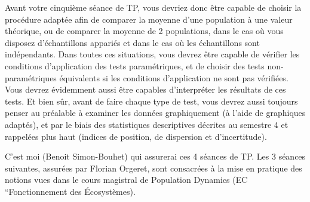 \documentclass[
  french,
  a4paper,
  DIV=11,
  numbers=noendperiod,
  oneside]{scrreprt}
\begin{document}
Avant votre cinquième séance de TP, vous devriez donc être capable de
choisir la procédure adaptée afin de comparer la moyenne d'une
population à une valeur théorique, ou de comparer la moyenne de 2
populations, dans le cas où vous disposez d'échantillons appariés et
dans le cas où les échantillons sont indépendants. Dans toutes ces
situations, vous devrez être capable de vérifier les conditions
d'application des tests paramétriques, et de choisir des tests
non-paramétriques équivalents si les conditions d'application ne sont
pas vérifiées. Vous devrez évidemment aussi être capables d'interpréter
les résultats de ces tests. Et bien sûr, avant de faire chaque type de
test, vous devrez aussi toujours penser au préalable à examiner les
données graphiquement (à l'aide de graphiques adaptés), et par le biais
des statistiques descriptives décrites au semestre 4 et rappelées plus
haut (indices de position, de dispersion et d'incertitude).

C'est moi (Benoit Simon-Bouhet) qui assurerai ces 4 séances de TP. Les 3
séances suivantes, assurées par Florian Orgeret, sont consacrées à la
mise en pratique des notions vues dans le cours magistral de Population
Dynamics (EC ``Fonctionnement des Écosystèmes).
\end{document}
